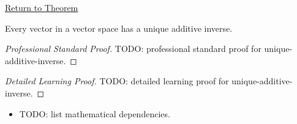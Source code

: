 \newpage
{}
\label{prf:unique-additive-inverse}

\begin{remark*}[Return]
\hyperref[thm:unique-additive-inverse]{Return to Theorem}
\end{remark*}

\begin{theorem*}
Every vector in a vector space has a unique additive inverse.
\end{theorem*}

\begin{proof}[Professional Standard Proof]
\LRAProofBodyStart
TODO: professional standard proof for unique-additive-inverse.
\end{proof}

\begin{proof}[Detailed Learning Proof]
\LRAProofBodyStart
TODO: detailed learning proof for unique-additive-inverse.
\end{proof}

\begin{remark*}
\end{remark*}

\begin{dependencies}
\begin{itemize}
  \item TODO: list mathematical dependencies.
\end{itemize}
\end{dependencies}

\clearpage
